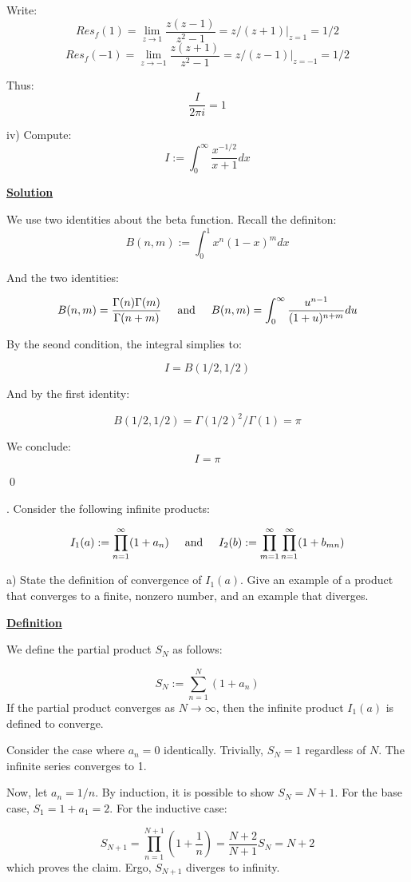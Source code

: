 \documentclass{article}
\newcommand{\new}[1]{
    \vspace{2mm}
    \noindent
    \textbf{
    \underline{#1}}
}
\newcounter{problemcnt}
\newcommand{\Problem}{{
    \vspace{5mm}
    \stepcounter{problemcnt}
    \noindent
    \arabic{problemcnt}. 
}
}
\newcommand{\textAnd}{
    {
        \hspace{5mm}
        \textrm{and}
        \hspace{5mm}
    }
}
\begin{document}
Write:
\[
    Res_f(1) = \lim_{z \rightarrow 1} 
    \frac{z(z - 1)}{z^2 - 1}
    = z/(z+1)\bigg|_{z = 1} = 1/2
\]
\[
    Res_f(-1) = \lim_{z \rightarrow -1} 
    \frac{z(z + 1)}{z^2 - 1}
    = z/(z-1)\bigg|_{z = -1} = 1/2
\]

Thus:
\[
    \boxed{
    \frac{I}{2\pi i} = 1
    }
\]




\newpage

iv) Compute:
\[
    I:=
    \int_0^\infty {
        \frac{x^{-1/2}}
        {x+1}
        dx
    }
\]
\new{Solution}
We use two identities about the beta function. Recall
the definiton:
\[
    B(n, m) := \int_0^1 x^n(1-x)^mdx
\]

And the two identities:

\[
    B(n, m) = \frac{\Gamma(n)\Gamma(m)}{\Gamma(n+m)}
    \textAnd 
    B(n, m) = \int_0^\infty 
    \frac{u^{n - 1}}{(1+u)^{n+m}} du
\]

By the seond condition, the integral simplies to:

\[
    I = B(1/2, 1/2)
\]

And by the first identity:

\[
    B(1/2, 1/2) = \Gamma(1/2)^2/\Gamma(1) = \pi
\]

We conclude:
\[
    I = \pi
\]

\qed

\newpage

\Problem Consider the following infinite products:

\[
    I_1(a) := \prod_{n = 1}^\infty (1+a_n)
    \textAnd 
    I_2(b) := \prod_{m = 1}^\infty 
    \prod_{n = 1}^\infty(1 + b_{mn})
\]

a) State the definition of convergence of $I_1(a)$. 
Give an example of a product that converges to 
a finite, nonzero number, and an example that diverges. 

\new{Definition} 
We define the partial product $S_N$ as follows:

\[
    S_N := \sum_{n = 1}^N (1+a_n)
\]
If the partial product converges as $N \rightarrow \infty$, 
then the infinite product $I_1(a)$ is defined to converge. 

Consider the case where $a_n = 0$ identically. Trivially, 
$S_N = 1$ regardless of $N$. The infinite series converges 
to 1. 

Now, let $a_n = 1/n$. By induction, it is possible to 
show $S_N = N + 1$. For the base case, $S_1 = 1 + a_1 = 2$. 
For the inductive case:

\[
    S_{N+1} = \prod^{N+1}_{n=1}(1+\frac{1}{n})
    =\frac{N+2}{N+1} S_{N} = N+2
\]
which proves the claim. Ergo, $S_{N+1}$ diverges to infinity. 
\end{document}
